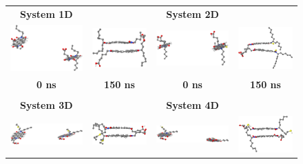 \begin{figure}[htb]
	\begin{tabular}{cccc}
		\small\textbf{System 1D} &  & \small\textbf{System 2D} &\\
		\includegraphics[width=0.2\columnwidth]{image/D_M1_0ns} & 
		\includegraphics[width=0.2\columnwidth]{image/D_M1_150ns} &
		\includegraphics[width=0.2\columnwidth]{image/D_M2_0ns} &
		 \includegraphics[width=0.2\columnwidth]{image/D_M2_150ns}\\   
		\small\textbf{0 ns} & \small\textbf{150 ns} & \small\textbf{0 ns} & \small\textbf{150 ns} \\
		&&&\\
		\small\textbf{System 3D} &  & \small\textbf{System 4D} &\\
		\includegraphics[width=0.2\columnwidth]{image/D_M3_0ns} & \includegraphics[width=0.2\columnwidth]{image/D_M3_150ns} &
		\includegraphics[width=0.2\columnwidth]{image/D_M4_0ns} & \includegraphics[width=0.2\columnwidth]{image/D_M4_150ns} \\

\end{tabular}
\end{figure}
